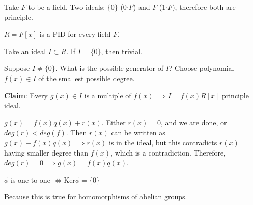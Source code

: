\documentclass[twoside, 10pt]{article}
\newcommand{\Ker}{\text{Ker}}
\begin{document}
Take $F$ to be a field. Two ideals: $\{0\}$ (0$\cdot F$) and $F$ (1$\cdot F$), therefore both are principle.

\begin{thm}
    $R = F[x]$ is a PID for every field $F$.
\end{thm}
Take an ideal $I \subset R$. If $I = \{0\}$, then trivial. 

Suppose $I\neq \{0\}$. What is the possible generator of $I$? Choose polynomial $f(x) \in I$ of the smallest possible degree.

\textbf{Claim}: Every $g(x) \in I$ is a multiple of $f(x) \implies I = f(x)R[x]$ principle ideal.

$g(x) = f(x)q(x) + r(x)$. Either $r(x) = 0$, and we are done, or $deg(r) < deg(f)$. Then $r(x)$ can be written as $g(x) - f(x)q(x) \implies r(x)$ is in the ideal, but this contradicts $r(x)$ having smaller degree than $f(x)$, which is a contradiction. Therefore, $deg(r) = 0 \implies g(x) = f(x)q(x)$.

\begin{rmk}
    $\phi$ is one to one $\iff \Ker\phi = \{0\}$
\end{rmk}
Because this is true for homomorphisms of abelian groups.
\end{document}
